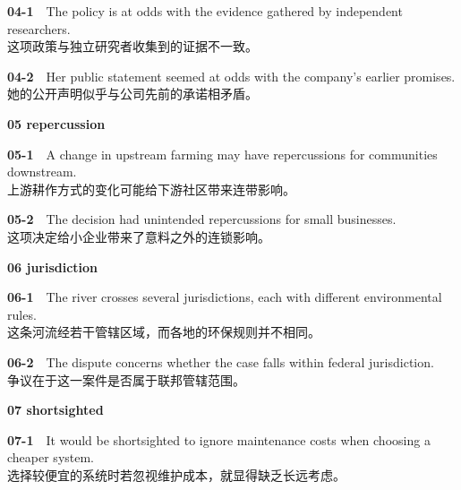\documentclass[a4paper,11pt,openany]{report}
\newcommand{\zhline}[1]{{\CJKsf\color{bodygrey}#1}}
\begin{document}
\begin{samepage}
\textbf{04-1}　The policy is at odds with the evidence gathered by independent researchers.\\
\zhline{这项政策与独立研究者收集到的证据不一致。}
\par\end{samepage}

\begin{samepage}
\textbf{04-2}　Her public statement seemed at odds with the company's earlier promises.\\
\zhline{她的公开声明似乎与公司先前的承诺相矛盾。}
\par\end{samepage}

\textbf{05 repercussion}

\begin{samepage}
\textbf{05-1}　A change in upstream farming may have repercussions for communities downstream.\\
\zhline{上游耕作方式的变化可能给下游社区带来连带影响。}
\par\end{samepage}

\begin{samepage}
\textbf{05-2}　The decision had unintended repercussions for small businesses.\\
\zhline{这项决定给小企业带来了意料之外的连锁影响。}
\par\end{samepage}

\textbf{06 jurisdiction}

\begin{samepage}
\textbf{06-1}　The river crosses several jurisdictions, each with different environmental rules.\\
\zhline{这条河流经若干管辖区域，而各地的环保规则并不相同。}
\par\end{samepage}

\begin{samepage}
\textbf{06-2}　The dispute concerns whether the case falls within federal jurisdiction.\\
\zhline{争议在于这一案件是否属于联邦管辖范围。}
\par\end{samepage}

\textbf{07 shortsighted}

\begin{samepage}
\textbf{07-1}　It would be shortsighted to ignore maintenance costs when choosing a cheaper system.\\
\zhline{选择较便宜的系统时若忽视维护成本，就显得缺乏长远考虑。}
\par\end{samepage}
\end{document}

